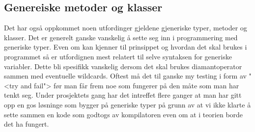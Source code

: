 \subsection{Genereiske metoder og klasser}
Det har også oppkommet noen utfordinger gjeldene gjeneriske typer, metoder og klasser. Det er generelt ganske vanskelig å sette seg inn i programmering med generiske typer. Even om kan kjenner til prinsippet og hvordan det skal brukes i programmet så er utfordignen mest relatert til selve syntaksen for generiske variabler. Dette bli spesifikk vanskelig dersom det skal brukes diamantoperator sammen med eventuelle wildcards. Oftest må det til ganske my testing i form av "<try and fail"> før man får frem noe som fungerer på den måte som man har tenkt seg. Under prosjektets gang har det intreffet flere ganger at man har gitt opp en gos løsninge som bygger på generiske typer på grunn av at vi ikke klarte å sette sammen en kode som godtogs av kompilatoren even om at i teorien borde det ha fungert.